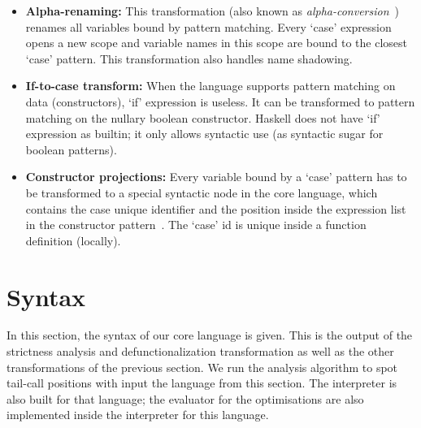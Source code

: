 \documentclass[diploma]{softlab-thesis}
\begin{document}
\begin{itemize}
  \item \textbf{Alpha-renaming:}  This transformation (also known as \emph{alpha-conversion}~\cite{Barendregt:1993:LCT:162552.162561}) renames all variables bound by pattern matching.
  Every `case' expression opens a new scope and variable names in this scope are bound to the closest 
  `case' pattern. This transformation also handles name shadowing. 
  \item \textbf{If-to-case transform:}  When the language supports pattern matching on data 
  (constructors), `if' expression is useless. It can be transformed to pattern matching on 
  the nullary boolean constructor. Haskell does not have `if' expression as builtin; it only allows
  syntactic use (as syntactic sugar for boolean patterns).
  \item \textbf{Constructor projections:}  Every variable bound by a `case' pattern has to be 
  transformed to a special syntactic node in the core language, which contains the case unique identifier
  and the position inside the expression list in the constructor pattern~\cite{Fourtounis:2013:GIT:2769663.2769674}. The `case' id is 
  unique inside a function definition (locally).
\end{itemize}

\section{Syntax}
\label{sec:syntax}

In this section, the syntax of our core language is given.
This is the output of the strictness analysis and 
defunctionalization transformation as well as the other transformations of the previous 
section. We run the analysis algorithm to spot tail-call positions with input 
the language from this section. The interpreter is also built for that language; the evaluator for 
the optimisations are also implemented inside the interpreter for this language.
\end{document}
